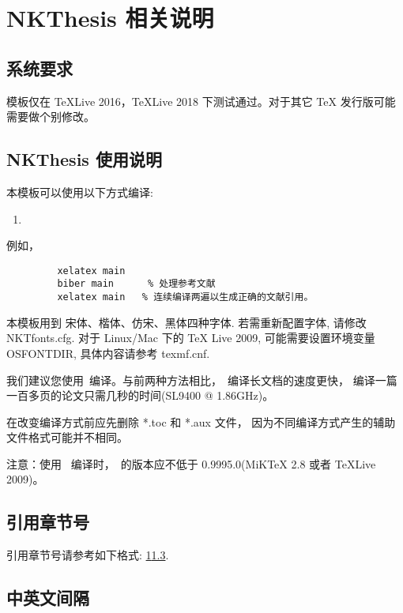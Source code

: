 \documentclass[12pt,openright]{book}
\begin{document}
\chapter{NKThesis 相关说明} 
\label{chpt:relatedwork}

\section{系统要求}

模板仅在 TeXLive 2016，TeXLive 2018 下测试通过。对于其它 TeX 发行版可能需要做个别修改。

\section{NKThesis 使用说明}

本模板可以使用以下方式编译:
\begin{enumerate}
 \item \XeLaTeX [推荐]
\end{enumerate}

例如，
\begin{verbatim}
         xelatex main
         biber main      % 处理参考文献
         xelatex main   % 连续编译两遍以生成正确的文献引用。
\end{verbatim}





本模板用到 宋体、楷体、仿宋、黑体四种字体. 若需重新配置字体, 请修改 NKTfonts.cfg.
对于 Linux/Mac 下的 TeX Live 2009, 可能需要设置环境变量 OSFONTDIR, 具体内容请参考 texmf.cnf.


我们建议您使用\XeLaTeX\ 编译。与前两种方法相比，\XeLaTeX\  编译长文档的速度更快，
编译一篇一百多页的论文只需几秒的时间(SL9400 @ 1.86GHz)。

在改变编译方式前应先删除 *.toc 和 *.aux 文件，
因为不同编译方式产生的辅助文件格式可能并不相同。



注意：使用 \XeLaTeX\ 编译时，\XeTeX\ 的版本应不低于 0.9995.0(MiKTeX 2.8 或者 TeXLive 2009)。


\section{引用章节号}
\label{sec:ex:A}

引用章节号请参考如下格式: \ref{chpt:relatedwork}\ref{sec:ex:A}.


\section{中英文间隔}
\end{document}
